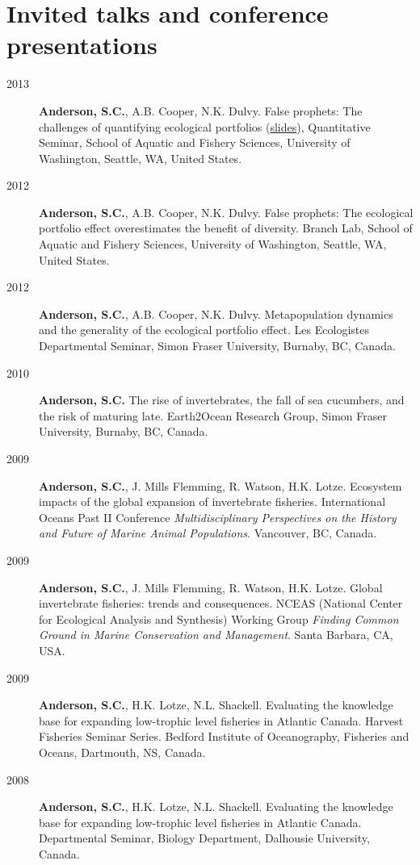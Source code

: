 \section{Invited talks and conference presentations}

\begin{description}
\item[2013]
\textbf{Anderson, S.C.}, A.B. Cooper, N.K. Dulvy. False prophets: The
challenges of quantifying ecological portfolios
(\href{talks/2013/PE_SAFS_quantsem.pdf}{slides}), Quantitative Seminar,
School of Aquatic and Fishery Sciences, University of Washington,
Seattle, WA, United States.
\item[2012]
\textbf{Anderson, S.C.}, A.B. Cooper, N.K. Dulvy. False prophets: The
ecological portfolio effect overestimates the benefit of diversity.
Branch Lab, School of Aquatic and Fishery Sciences, University of
Washington, Seattle, WA, United States.
\item[2012]
\textbf{Anderson, S.C.}, A.B. Cooper, N.K. Dulvy. Metapopulation
dynamics and the generality of the ecological portfolio effect. Les
Ecologistes Departmental Seminar, Simon Fraser University, Burnaby, BC,
Canada.
\item[2010]
\textbf{Anderson, S.C.} The rise of invertebrates, the fall of sea
cucumbers, and the risk of maturing late. Earth2Ocean Research Group,
Simon Fraser University, Burnaby, BC, Canada.
\item[2009]
\textbf{Anderson, S.C.}, J. Mills Flemming, R. Watson, H.K. Lotze.
Ecosystem impacts of the global expansion of invertebrate fisheries.
International Oceans Past II Conference \emph{Multidisciplinary
Perspectives on the History and Future of Marine Animal Populations}.
Vancouver, BC, Canada.
\item[2009]
\textbf{Anderson, S.C.}, J. Mills Flemming, R. Watson, H.K. Lotze.
Global invertebrate fisheries: trends and consequences. NCEAS (National
Center for Ecological Analysis and Synthesis) Working Group
\emph{Finding Common Ground in Marine Conservation and Management}.
Santa Barbara, CA, USA.
\item[2009]
\textbf{Anderson, S.C.}, H.K. Lotze, N.L. Shackell. Evaluating the
knowledge base for expanding low-trophic level fisheries in Atlantic
Canada. Harvest Fisheries Seminar Series. Bedford Institute of
Oceanography, Fisheries and Oceans, Dartmouth, NS, Canada.
\item[2008]
\textbf{Anderson, S.C.}, H.K. Lotze, N.L. Shackell. Evaluating the
knowledge base for expanding low-trophic level fisheries in Atlantic
Canada. Departmental Seminar, Biology Department, Dalhousie University,
Canada.
\end{description}

